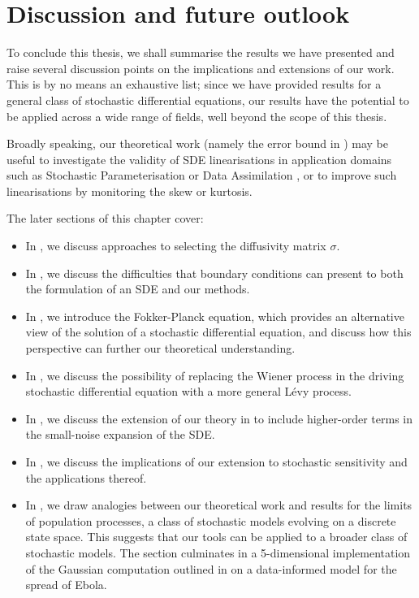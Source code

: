 \chapter{Discussion and future outlook}\label{ch:outlook}
To conclude this thesis, we shall summarise the results we have presented and raise several discussion points on the implications and extensions of our work.
This is by no means an exhaustive list; since we have provided results for a general class of stochastic differential equations, our results have the potential to be applied across a wide range of fields, well beyond the scope of this thesis.

Broadly speaking, our theoretical work (namely the error bound in ) may be useful to investigate the validity of SDE linearisations in application domains such as Stochastic Parameterisation \citep{BernerEtAl_2017_StochasticParameterizationNew,Palmer_2019_StochasticWeatherClimate,LeutbecherEtAl_2017_StochasticRepresentationsModel} or Data Assimilation \citep{BudhirajaEtAl_2019_AssimilatingDataModels,ReichCotter_2015_ProbabilisticForecastingBayesian,LawEtAl_2015_DataAssimilationMathematical}, or to improve such linearisations by monitoring the skew or kurtosis.

The later sections of this chapter cover:
\begin{itemize}
	\item In , we discuss approaches to selecting the diffusivity matrix \(\sigma\).
	\item In , we discuss the difficulties that boundary conditions can present to both the formulation of an SDE and our methods.
	\item In , we introduce the Fokker-Planck equation, which provides an alternative view of the solution of a stochastic differential equation, and discuss how this perspective can further our theoretical understanding.
	\item In , we discuss the possibility of replacing the Wiener process in the driving stochastic differential equation with a more general L\'evy process.
	\item In , we discuss the extension of our theory in  to include higher-order terms in the small-noise expansion of the SDE.
	\item In , we discuss the implications of our extension to stochastic sensitivity and the applications thereof.
	\item In , we draw analogies between our theoretical work and results for the limits of population processes, a class of stochastic models evolving on a discrete state space.
	      This suggests that our tools can be applied to a broader class of stochastic models.
	      The section culminates in a 5-dimensional implementation of the Gaussian computation outlined in  on a data-informed model for the spread of Ebola.
\end{itemize}

